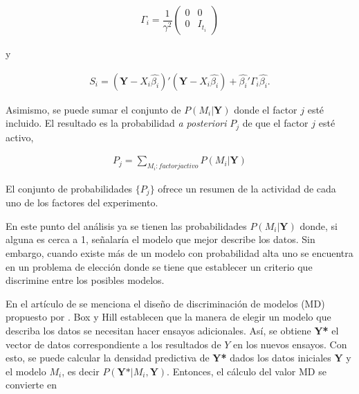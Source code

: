 \begin{equation} \label{gamma_i}
	\begin{aligned}
		\Gamma_i = \dfrac{1}{\gamma^{2}} 
		\begin{pmatrix}
			0 & 0 \\
			0 & I_{t_i}
		\end{pmatrix} 
	\end{aligned}
\end{equation}

y 

\begin{equation} \label{delta_i}
	\begin{aligned}
		S_i = (\textbf{Y} - X_i \hat{\beta_i})' (\textbf{Y} - X_i \hat{\beta_i}) + \hat{\beta_i}' \Gamma_i \hat{\beta_i}.
	\end{aligned}
\end{equation}

Asimismo, se puede sumar el conjunto de $P(M_i | \textbf{Y})$ donde el factor $j$ esté incluido. El resultado es la probabilidad \textit{a posteriori}  $P_j$ de que el factor $j$ esté activo, 

\begin{equation} \label{eq_pj}
	\begin{aligned}
		P_j = \sum_{M_i:factorjactivo} P(M_i | \textbf{Y})
	\end{aligned}
\end{equation}

El conjunto de probabilidades $\{ P_j \}$ ofrece un resumen de la actividad de cada uno de los factores del experimento. 

En este punto del análisis ya se tienen las probabilidades $P(M_i | \textbf{Y})$ donde, si alguna es cerca a 1, señalaría el modelo que mejor describe los datos. Sin embargo, cuando existe más de un modelo con probabilidad alta uno se encuentra en un problema de elección donde se tiene que establecer un criterio que discrimine entre los posibles modelos. 

En el artículo de \cite{meyer1996} se menciona el diseño de discriminación de modelos (MD) propuesto por \cite{hillybox1967}.  Box y Hill establecen que la manera de elegir un modelo que describa los datos se necesitan hacer ensayos adicionales. Así, se obtiene \textbf{Y*} el vector de datos correspondiente a los resultados de \textbf{$Y$} en los nuevos ensayos. Con esto, se puede calcular la densidad predictiva de \textbf{Y*} dados los datos iniciales $\textbf{Y}$ y el modelo $M_i$, es decir $P(\textbf{Y*} | M_i, \textbf{Y})$. Entonces, el cálculo del valor MD se convierte en 

